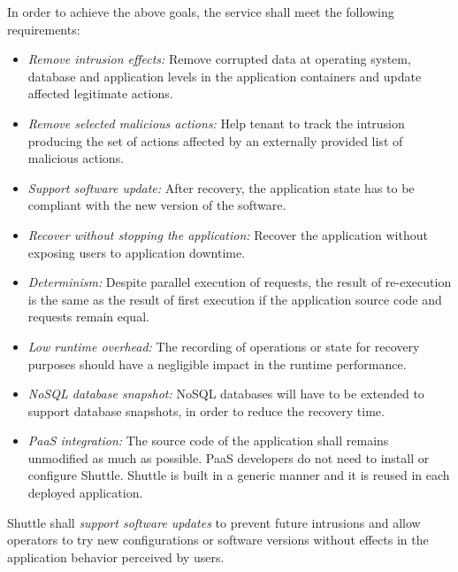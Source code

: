In order to achieve the above goals, the service shall meet the following requirements: 
\begin{itemize}
\item \textit{Remove intrusion effects:} Remove corrupted data at operating system, database and application levels in the application containers and update affected legitimate actions.
\item \textit{Remove selected malicious actions:} Help tenant to track the intrusion producing the set of actions affected by an externally provided list of malicious actions.
\item \textit{Support software update:} After recovery, the application state has to be compliant with the new version of the software.
\item \textit{Recover without stopping the application:} Recover the application without exposing users to application downtime.
\item \textit{Determinism:} Despite parallel execution of requests, the result of re-execution is the same as the result of first execution if the application source code and requests remain equal.
\item \textit{Low runtime overhead:} The recording of operations or state for recovery purposes should have a negligible impact in the runtime performance.
\item \textit{\acs{NoSQL} database snapshot:} \acs{NoSQL} databases will have to be extended to support database snapshots, in order to reduce the recovery time.
\item \textit{\ac{PaaS} integration:} The source code of the application shall remains unmodified as much as possible. \ac{PaaS} developers do not need to install or configure Shuttle. Shuttle is built in a generic manner and it is reused in each deployed application.
\end{itemize}

Shuttle shall \textit{support software updates} to prevent future intrusions and allow operators to try new configurations or software versions without effects in the application behavior perceived by users. 


